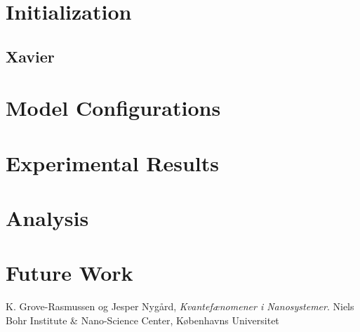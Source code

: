 \documentclass[a4paper]{article}
\begin{document}
\section{Initialization}
\label{sec:initialization}

\subsection{Xavier}
\label{sec:xavier}

\section{Model Configurations}
\label{sec:configuration}

\section{Experimental Results}
\label{sec:results}

\section{Analysis}
\label{sec:analysis}

\section{Future Work}
\label{sec:future}

\begin{thebibliography}{9}
  K. Grove-Rasmussen og Jesper Nygård,
  \emph{Kvantefænomener i Nanosystemer}.
  Niels Bohr Institute \& Nano-Science Center, Københavns Universitet

\end{thebibliography}
\end{document}
